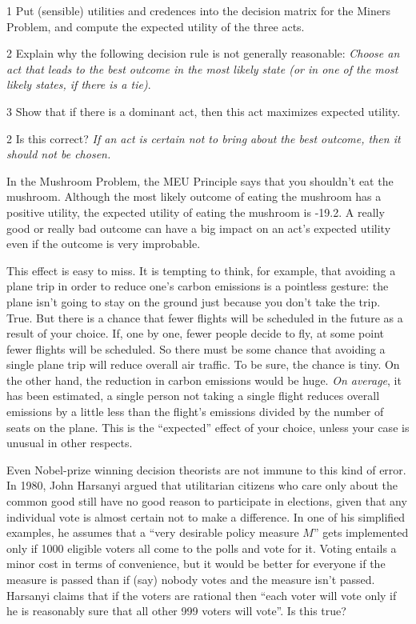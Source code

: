 \begin{exercise}{1}
  Put (sensible) utilities and credences into the decision matrix for the Miners
  Problem, and compute the expected utility of the three acts.
\end{exercise}

\begin{exercise}{2}
  Explain why the following decision rule is not generally reasonable:
  \emph{Choose an act that leads to the best outcome in the most likely state (or in one of the most likely states, if there is a tie)}.
\end{exercise}

\begin{exercise}{3}
  Show that if there is a dominant act, then this act maximizes
  expected utility.
\end{exercise}

\begin{exercise}{2}
  Is this correct? \emph{If an act is certain not to bring about the best
    outcome, then it should not be chosen.}
\end{exercise}

In the Mushroom Problem, the MEU Principle says that you shouldn't eat the
mushroom. Although the most likely outcome of eating the mushroom has a positive
utility, the expected utility of eating the mushroom is -19.2. A really good or
really bad outcome can have a big impact on an act's expected utility even if
the outcome is very improbable.

This effect is easy to miss. It is tempting to think, for example, that avoiding
a plane trip in order to reduce one's carbon emissions is a pointless gesture:
the plane isn't going to stay on the ground just because you don't take the
trip. True. But there is a chance that fewer flights will be scheduled in
the future as a result of your choice. If, one by one, fewer people decide to
fly, at some point fewer flights will be scheduled. So there must be some chance
that avoiding a single plane trip will reduce overall air traffic. To be sure,
the chance is tiny. On the other hand, the reduction in carbon emissions would
be huge. \emph{On average}, it has been estimated, a single person not taking a
single flight reduces overall emissions by a little less than the flight's
emissions divided by the number of seats on the plane. This is the ``expected''
effect of your choice, unless your case is unusual in other respects.

Even Nobel-prize winning decision theorists are not immune to this kind of
error. In 1980, John Harsanyi argued that utilitarian citizens who care only
about the common good still have no good reason to participate in elections,
given that any individual vote is almost certain not to make a difference. In
one of his simplified examples, he assumes that a ``very desirable policy
measure $M$'' gets implemented only if 1000 eligible voters all come to the
polls and vote for it. Voting entails a minor cost in terms of convenience, but
it would be better for everyone if the measure is passed than if (say) nobody
votes and the measure isn't passed. Harsanyi claims that if the voters are
rational then ``each voter will vote only if he is reasonably sure that all
other 999 voters will vote''. Is this true?

